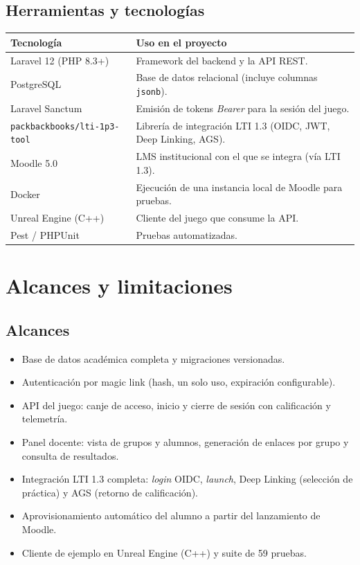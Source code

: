\documentclass[12pt,letterpaper,oneside]{report}
\begin{document}
\section{Herramientas y tecnologías}
\begin{longtable}{p{4.2cm} p{9.5cm}}
\toprule
\textbf{Tecnología} & \textbf{Uso en el proyecto} \\
\midrule
\endhead
Laravel 12 (PHP 8.3+) & Framework del backend y la API REST. \\
PostgreSQL & Base de datos relacional (incluye columnas \texttt{jsonb}). \\
Laravel Sanctum & Emisión de tokens \emph{Bearer} para la sesión del juego. \\
\texttt{packbackbooks/lti-1p3-tool} & Librería de integración LTI 1.3 (OIDC, JWT, Deep Linking, AGS). \\
Moodle 5.0 & LMS institucional con el que se integra (vía LTI 1.3). \\
Docker & Ejecución de una instancia local de Moodle para pruebas. \\
Unreal Engine (C++) & Cliente del juego que consume la API. \\
Pest / PHPUnit & Pruebas automatizadas. \\
\bottomrule
\end{longtable}

\chapter{Alcances y limitaciones}

\section{Alcances}
\begin{itemize}[leftmargin=1.4em]
  \item Base de datos académica completa y migraciones versionadas.
  \item Autenticación por magic link (hash, un solo uso, expiración configurable).
  \item API del juego: canje de acceso, inicio y cierre de sesión con calificación
  y telemetría.
  \item Panel docente: vista de grupos y alumnos, generación de enlaces por grupo
  y consulta de resultados.
  \item Integración LTI 1.3 completa: \emph{login} OIDC, \emph{launch}, Deep
  Linking (selección de práctica) y AGS (retorno de calificación).
  \item Aprovisionamiento automático del alumno a partir del lanzamiento de Moodle.
  \item Cliente de ejemplo en Unreal Engine (C++) y suite de 59 pruebas.
\end{itemize}
\end{document}
